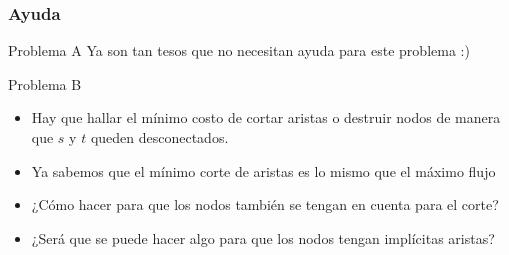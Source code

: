 \documentclass{beamer}
\begin{document}
	\begin{frame}
		\frametitle{Ayuda}
		\begin{block}{Problema A}
			Ya son tan tesos que no necesitan ayuda para este problema :)
		\end{block}
		\begin{block}{Problema B}
			\begin{itemize}
				\item Hay que hallar el mínimo costo de cortar aristas o destruir nodos de manera que $s$ y $t$ queden desconectados.
				\item Ya sabemos que el mínimo corte de aristas es lo mismo que el máximo flujo
				\item ¿Cómo hacer para que los nodos también se tengan en cuenta para el corte?
				\item ¿Será que se puede hacer algo para que los nodos tengan implícitas aristas?
			\end{itemize}
		\end{block}
	\end{frame}
\end{document}
